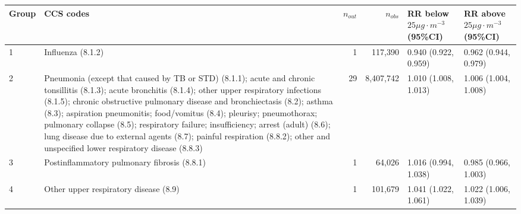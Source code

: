 \begin{tabular}{lp{6.5cm}rrp{2.2cm}p{2.2cm}}
  \hline
Group & CCS codes & $n_{out}$ & $n_{obs}$ & RR below $25 \mu g \cdot m^{-3}$ (95\%CI) & RR above $25 \mu g \cdot m^{-3}$ (95\%CI) \\ 
  \hline
   1 & Influenza (8.1.2) &    1 & 117,390 & 0.940 (0.922, 0.959) & 0.962 (0.944, 0.979) \\ 
     2 & Pneumonia (except that caused by TB or STD) (8.1.1); acute and chronic tonsillitis (8.1.3); acute bronchitis (8.1.4); other upper respiratory infections (8.1.5); chronic obstructive pulmonary disease and bronchiectasis (8.2); asthma (8.3); aspiration pneumonitis; food/vomitus (8.4); pleurisy; pneumothorax; pulmonary collapse (8.5); respiratory failure; insufficiency; arrest (adult) (8.6); lung disease due to external agents (8.7); painful respiration (8.8.2); other and unspecified lower respiratory disease (8.8.3) &   29 & 8,407,742 & 1.010 (1.008, 1.013) & 1.006 (1.004, 1.008) \\ 
     3 & Postinflammatory pulmonary fibrosis (8.8.1) &    1 & 64,026 & 1.016 (0.994, 1.038) & 0.985 (0.966, 1.003) \\ 
     4 & Other upper respiratory disease (8.9) &    1 & 101,679 & 1.041 (1.022, 1.061) & 1.022 (1.006, 1.039) \\ 
   \hline
\end{tabular}

